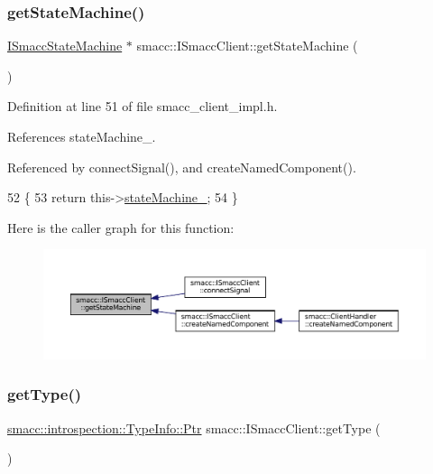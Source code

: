 \subsubsection{\texorpdfstring{get\+State\+Machine()}{getStateMachine()}}
{\footnotesize\ttfamily \hyperlink{classsmacc_1_1ISmaccStateMachine}{I\+Smacc\+State\+Machine} $\ast$ smacc\+::\+I\+Smacc\+Client\+::get\+State\+Machine (\begin{DoxyParamCaption}{ }\end{DoxyParamCaption})\hspace{0.3cm}{\ttfamily [inline]}}



Definition at line 51 of file smacc\+\_\+client\+\_\+impl.\+h.



References state\+Machine\+\_\+.



Referenced by connect\+Signal(), and create\+Named\+Component().


\begin{DoxyCode}
52 \{
53     \textcolor{keywordflow}{return} this->\hyperlink{classsmacc_1_1ISmaccClient_a926e4f2ae796def63d48dca389a48c47}{stateMachine\_};
54 \}
\end{DoxyCode}
Here is the caller graph for this function\+:
\nopagebreak
\begin{figure}[H]
\begin{center}
\leavevmode
\includegraphics[width=350pt]{classsmacc_1_1ISmaccClient_aec51d4712404cb9882b86e4c854bb93a_icgraph}
\end{center}
\end{figure}
\mbox{\label{classsmacc_1_1ISmaccClient_ae7faf4e40510c73810e6b0ef9fec8f33}} 
\subsubsection{\texorpdfstring{get\+Type()}{getType()}}
{\footnotesize\ttfamily \hyperlink{classsmacc_1_1introspection_1_1TypeInfo_aa6ffd9c39811d59f7c771941b7fad860}{smacc\+::introspection\+::\+Type\+Info\+::\+Ptr} smacc\+::\+I\+Smacc\+Client\+::get\+Type (\begin{DoxyParamCaption}{ }\end{DoxyParamCaption})\hspace{0.3cm}{\ttfamily [virtual]}}



